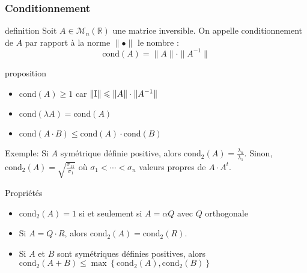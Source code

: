 \documentclass{beamer}
\begin{document}
\begin{frame}
\frametitle{Conditionnement}

\begin{block}{definition}
Soit $A \in \mathscr{M}_n(\mathbb{R})$ une matrice inversible. On appelle conditionnement de $A$ par rapport à la norme $\| \bullet \|$ le nombre :
\[
\mbox{cond}(A) = \|A \| \cdot \| A^{-1}\|
\] 
\end{block}

\begin{block}{proposition}
\begin{itemize}
\item $\mbox{cond}(A) \geqslant 1$ car $\| {\rm I} \| \leqslant \|A \| \cdot \| A^{-1}\|$
\item $\mbox{cond}(\lambda A) = \mbox{cond} (A)$
\item $\mbox{cond} (A \cdot B ) \leqslant \mbox{cond}(A) \cdot \mbox{cond}(B)$
\end{itemize}
\end{block}

Exemple: 
Si $A$ symétrique définie positive, alors $\mbox{cond}_2(A)=\frac{\lambda_n}{\lambda_1}$. Sinon, $\mbox{cond}_2(A)=\sqrt{\frac{\sigma_{11}}{\sigma_1}}$ où $\sigma_1 < \cdots <\sigma_n$ valeurs propres de $A \cdot A^t$.



\end{frame}

\begin{frame}

\begin{block}{Propriétés}
\begin{itemize}
\item $\mbox{cond}_2(A) =1 $ si et seulement si $A = \alpha Q$ avec $Q $ orthogonale
\item  Si $A= Q \cdot R$, alors  $\mbox{cond}_2(A)= \mbox{cond}_2(R)$.
\item Si $A$ et $B$ sont symétriques définies positives, alors $\mbox{cond}_2(A+B) \leq \max\left\{ \mbox{cond}_2(A), \mbox{cond}_2(B)\right\}$
\end{itemize}
\end{block}
\end{frame}
\end{document}
